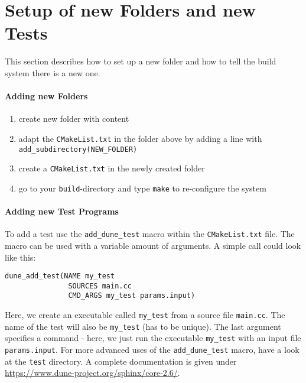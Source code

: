 \section{Setup of new Folders and new Tests}
\label{sc_newfoldersetup}
This section describes how to set up a new folder and how to tell
the build system there is a new one.
\paragraph{Adding new Folders}
\begin{enumerate}[1)]
 \item create new folder with content
 \item adapt the \verb+CMakeList.txt+ in the folder above by adding a line with
       \verb+add_subdirectory(NEW_FOLDER)+
 \item create a \verb+CMakeList.txt+ in the newly created folder
 \item go to your \texttt{build}-directory and type \verb+make+ to
       re-configure the system
\end{enumerate}

\paragraph{Adding new Test Programs}
\noindent To add a test use the \texttt{add\_dune\_test} macro within the \texttt{CMakeList.txt} file.
The macro can be used with a variable amount of arguments. A simple call could look like this:

\begin{lstlisting}[style=DumuxCode]
dune_add_test(NAME my_test
               SOURCES main.cc
               CMD_ARGS my_test params.input)
\end{lstlisting}

Here, we create an executable called \texttt{my\_test} from a source file \texttt{main.cc}.
The name of the test will also be \texttt{my\_test} (has to be unique). The last argument specifies a command - here, we just run the executable \texttt{my\_test} with an input file \texttt{params.input}. For more advanced uses of
the \texttt{add\_dune\_test} macro, have a look at the \texttt{test} directory. A complete documentation is given under \url{https://www.dune-project.org/sphinx/core-2.6/}.
